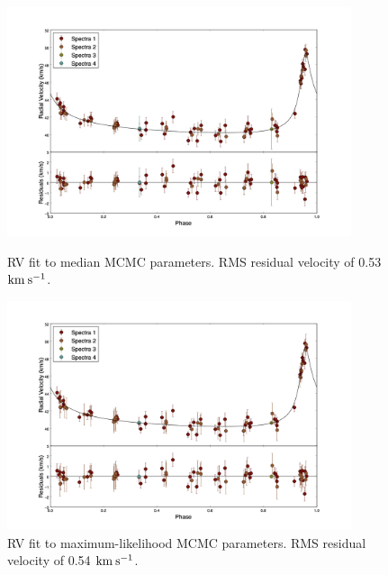 \documentclass{article}
\begin{document}
\begin{figure}[!htb]
\centering
\includegraphics[width=0.9\textwidth]{RVfit_meds_100000_errorMult.jpg}
\caption{RV fit to median MCMC parameters. RMS residual velocity of 0.53 $\rm{km \: s^{-1}}$.}

\includegraphics[width=0.9\textwidth]{RVfit_best_100000_errorMult.jpg}
\caption{RV fit to maximum-likelihood MCMC parameters. RMS residual velocity of 0.54 $\rm{km \: s^{-1}}$.}
\end{figure}
\end{document}
